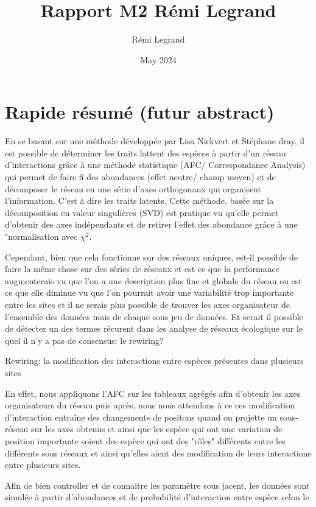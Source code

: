 \documentclass{article}
\title{Rapport M2 Rémi Legrand}
\author{Rémi Legrand}
\date{May 2024}
\begin{document}
\maketitle

\section{Rapide résumé  (futur abstract)}

En se basant sur une méthode développée par Lisa Nickvert et Stéphane dray, il est possible de déterminer les traits lattent des espèces à partir d'un réseau d'interactions grâce à une méthode statistique (AFC/ Correspondance Analysis) qui permet de faire fi des abondances (effet neutre/ champ moyen) et de décomposer le réseau en une série d'axes orthogonaux qui organisent l'information. C'est à dire les traits latents.
Cette méthode, basée sur la décomposition en valeur singulières (SVD) est pratique vu qu'elle permet d'obtenir des axes indépendants et de retirer l'effet des abondance grâce à une "normalisation avec $\chi^2$.

Cependant, bien que cela fonctionne sur des réseaux uniques, est-il possible de faire la même chose sur des séries de réseaux et est ce que la performance augmenterais vu que l'on a une description plus fine et globale du réseau ou est ce que elle diminue vu que l'on pourrait avoir une variabilité trop importante entre les sites et il ne serais plus possible de trouver les axes organisateur de l'ensemble des données mais de chaque sous jeu de données.
Et serait il possible de détecter un des termes récurent dans les analyse de réseaux écologique sur le quel il n'y a pas de consensus: le rewiring?

Rewiring: la modification des interactions entre espèces présentes dans plusieurs sites

En effet, nous appliquons l'AFC sur les tableaux agrégés afin d'obtenir les axes organisateurs du réseau puis après, nous nous attendons à ce ces modification d'interaction entraîne des changements de positons quand on projette un sous-réseau sur les axes obtenus et ainsi que les espèce qui ont une variation de position importante soient des espèce qui ont des "rôles" différents entre les différents sous réseaux et ainsi qu'elles aient des modification de leurs interactions entre plusieurs sites.

Afin de bien controller et de connaitre les paramètre sous jacent, les données sont simulée à partir d'abondances et de probabilité d'interaction entre espèce selon le  
\end{document}
